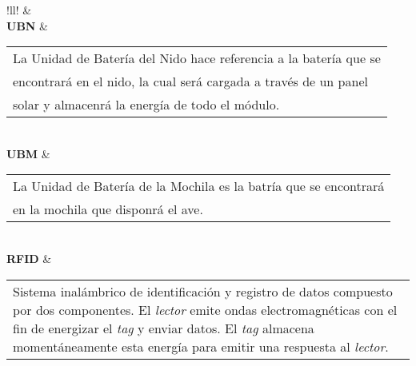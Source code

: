 \begin{table}[H]
\centering
\begin{tabular}{!{\color{AzulTable}\vrule}ll!{\color{AzulTable}\vrule}}
\hline
{}
 &  \\ \hline
\textbf{UBN}		& \begin{tabular}[l]{@{}l@{}}La Unidad de Batería del Nido hace referencia a la batería que se\\ encontrará en el nido, la cual será cargada a través de un panel\\ solar y almacenrá la energía de todo el módulo.\end{tabular}							\\ \hline
\textbf{UBM}		& \begin{tabular}[l]{@{}l@{}}La Unidad de Batería de la Mochila es la batría que se encontrará\\ en la mochila que disponrá el ave.\end{tabular}						\\ \hline
\textbf{RFID}		& \begin{tabular}[l]{@{}l@{}}Sistema inalámbrico de identificación y registro de datos compuesto por dos componentes. El \textit{lector} emite ondas electromagnéticas con el fin de energizar el \textit{tag} y enviar datos. El \textit{tag} almacena momentáneamente esta energía para emitir una respuesta al \textit{lector}. \end{tabular}						\\ \hline
\end{tabular}
\end{table}

